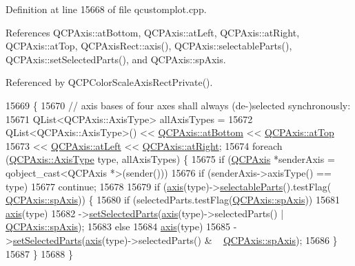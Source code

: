 Definition at line 15668 of file qcustomplot.\+cpp.



References Q\+C\+P\+Axis\+::at\+Bottom, Q\+C\+P\+Axis\+::at\+Left, Q\+C\+P\+Axis\+::at\+Right, Q\+C\+P\+Axis\+::at\+Top, Q\+C\+P\+Axis\+Rect\+::axis(), Q\+C\+P\+Axis\+::selectable\+Parts(), Q\+C\+P\+Axis\+::set\+Selected\+Parts(), and Q\+C\+P\+Axis\+::sp\+Axis.



Referenced by Q\+C\+P\+Color\+Scale\+Axis\+Rect\+Private().


\begin{DoxyCode}
15669                                           \{
15670   \textcolor{comment}{// axis bases of four axes shall always (de-)selected synchronously:}
15671   QList<QCPAxis::AxisType> allAxisTypes =
15672       QList<QCPAxis::AxisType>() << \hyperlink{class_q_c_p_axis_ae2bcc1728b382f10f064612b368bc18aa220d68888516b6c3b493d144f1ba438f}{QCPAxis::atBottom} << 
      \hyperlink{class_q_c_p_axis_ae2bcc1728b382f10f064612b368bc18aac0ece2b680d3f545e701f75af1655977}{QCPAxis::atTop}
15673                                  << \hyperlink{class_q_c_p_axis_ae2bcc1728b382f10f064612b368bc18aaf84aa6cac6fb6099f54a2cbf7546b730}{QCPAxis::atLeft} << 
      \hyperlink{class_q_c_p_axis_ae2bcc1728b382f10f064612b368bc18aadf5509f7d29199ef2f263b1dd224b345}{QCPAxis::atRight};
15674   \textcolor{keywordflow}{foreach} (\hyperlink{class_q_c_p_axis_ae2bcc1728b382f10f064612b368bc18a}{QCPAxis::AxisType} type, allAxisTypes) \{
15675     \textcolor{keywordflow}{if} (\hyperlink{class_q_c_p_axis}{QCPAxis} *senderAxis = qobject\_cast<QCPAxis *>(sender()))
15676       \textcolor{keywordflow}{if} (senderAxis->axisType() == type)
15677         \textcolor{keywordflow}{continue};
15678 
15679     \textcolor{keywordflow}{if} (\hyperlink{class_q_c_p_axis_rect_a560de44e47a4af0f86c59102a094b1e4}{axis}(type)->\hyperlink{class_q_c_p_axis_ad2bff3d2ed3d35c10d44c0c02441bd2c}{selectableParts}().testFlag(
      \hyperlink{class_q_c_p_axis_abee4c7a54c468b1385dfce2c898b115fa8949d2c1a31eccae9be7ed32e7a1ae38}{QCPAxis::spAxis})) \{
15680       \textcolor{keywordflow}{if} (selectedParts.testFlag(\hyperlink{class_q_c_p_axis_abee4c7a54c468b1385dfce2c898b115fa8949d2c1a31eccae9be7ed32e7a1ae38}{QCPAxis::spAxis}))
15681         \hyperlink{class_q_c_p_axis_rect_a560de44e47a4af0f86c59102a094b1e4}{axis}(type)
15682             ->\hyperlink{class_q_c_p_axis_ab9d7a69277dcbed9119b3c1f25ca19c3}{setSelectedParts}(\hyperlink{class_q_c_p_axis_rect_a560de44e47a4af0f86c59102a094b1e4}{axis}(type)->selectedParts() | 
      \hyperlink{class_q_c_p_axis_abee4c7a54c468b1385dfce2c898b115fa8949d2c1a31eccae9be7ed32e7a1ae38}{QCPAxis::spAxis});
15683       \textcolor{keywordflow}{else}
15684         \hyperlink{class_q_c_p_axis_rect_a560de44e47a4af0f86c59102a094b1e4}{axis}(type)
15685             ->\hyperlink{class_q_c_p_axis_ab9d7a69277dcbed9119b3c1f25ca19c3}{setSelectedParts}(\hyperlink{class_q_c_p_axis_rect_a560de44e47a4af0f86c59102a094b1e4}{axis}(type)->selectedParts() & ~
      \hyperlink{class_q_c_p_axis_abee4c7a54c468b1385dfce2c898b115fa8949d2c1a31eccae9be7ed32e7a1ae38}{QCPAxis::spAxis});
15686     \}
15687   \}
15688 \}
\end{DoxyCode}


